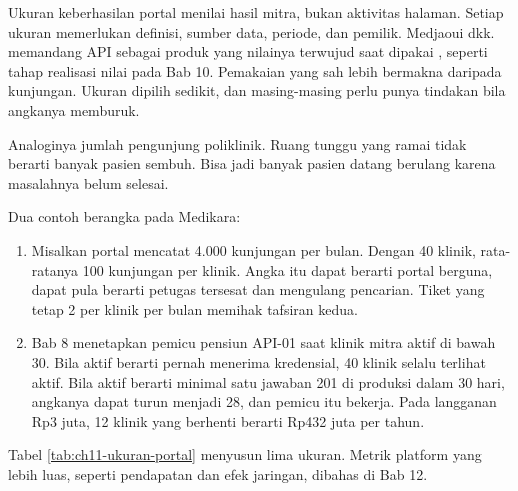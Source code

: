 Ukuran keberhasilan portal menilai hasil mitra, bukan aktivitas halaman. Setiap ukuran memerlukan definisi, sumber data, periode,
dan pemilik. Medjaoui dkk. memandang API sebagai produk yang nilainya terwujud saat dipakai \cite{medjaoui2021continuous}, seperti
tahap realisasi nilai pada Bab 10. Pemakaian yang sah lebih bermakna daripada kunjungan. Ukuran dipilih sedikit, dan masing-masing
perlu punya tindakan bila angkanya memburuk.

Analoginya jumlah pengunjung poliklinik. Ruang tunggu yang ramai tidak berarti banyak pasien sembuh. Bisa jadi banyak pasien datang
berulang karena masalahnya belum selesai.

Dua contoh berangka pada Medikara:
\begin{enumerate}
  \item Misalkan portal mencatat 4.000 kunjungan per bulan. Dengan 40 klinik, rata-ratanya 100 kunjungan per klinik. Angka itu dapat
        berarti portal berguna, dapat pula berarti petugas tersesat dan mengulang pencarian. Tiket yang tetap 2 per klinik per bulan
        memihak tafsiran kedua.
  \item Bab 8 menetapkan pemicu pensiun API-01 saat klinik mitra aktif di bawah 30. Bila aktif berarti pernah menerima kredensial,
        40 klinik selalu terlihat aktif. Bila aktif berarti minimal satu jawaban 201 di produksi dalam 30 hari, angkanya dapat turun
        menjadi 28, dan pemicu itu bekerja. Pada langganan Rp3 juta, 12 klinik yang berhenti berarti Rp432 juta per tahun.
\end{enumerate}

Tabel \ref{tab:ch11-ukuran-portal} menyusun lima ukuran. Metrik platform yang lebih luas, seperti pendapatan dan efek jaringan, dibahas
di Bab 12.

